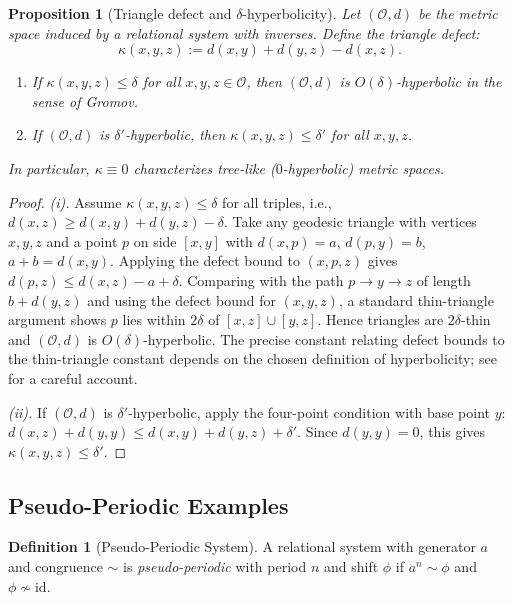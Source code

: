 \documentclass{article}
\newtheorem{proposition}[theorem]{Proposition}
\theoremstyle{definition}
\newtheorem{definition}[theorem]{Definition}
\theoremstyle{remark}
\newcommand{\id}{\mathrm{id}}
\begin{document}
\begin{proposition}[Triangle defect and $\delta$-hyperbolicity]
\label{prop:hyperbolicity}
Let $(\mathcal{O}, d)$ be the metric space induced by a relational
system with inverses. Define the \emph{triangle defect}:
\[
  \kappa(x, y, z) := d(x,y) + d(y,z) - d(x,z).
\]
\begin{enumerate}[label=(\roman*)]
  \item If $\kappa(x,y,z) \leq \delta$ for all $x,y,z \in
        \mathcal{O}$, then $(\mathcal{O}, d)$ is
        $O(\delta)$-hyperbolic in the sense of Gromov.
  \item If $(\mathcal{O}, d)$ is $\delta'$-hyperbolic, then
        $\kappa(x,y,z) \leq \delta'$ for all $x,y,z$.
\end{enumerate}
In particular, $\kappa \equiv 0$ characterizes tree-like
($0$-hyperbolic) metric spaces.
\end{proposition}

\begin{proof}
\textit{(i).} Assume $\kappa(x,y,z) \leq \delta$ for all triples,
i.e., $d(x,z) \geq d(x,y) + d(y,z) - \delta$. Take any geodesic
triangle with vertices $x,y,z$ and a point $p$ on side $[x,y]$
with $d(x,p) = a$, $d(p,y) = b$, $a + b = d(x,y)$. Applying the
defect bound to $(x,p,z)$ gives $d(p,z) \leq d(x,z) - a + \delta$.
Comparing with the path $p \to y \to z$ of length $b + d(y,z)$
and using the defect bound for $(x,y,z)$, a standard thin-triangle
argument shows $p$ lies within $2\delta$ of $[x,z] \cup [y,z]$.
Hence triangles are $2\delta$-thin and $(\mathcal{O},d)$ is
$O(\delta)$-hyperbolic. The precise constant relating defect
bounds to the thin-triangle constant depends on the chosen
definition of hyperbolicity; see~\cite{buragoetal} for a careful
account.

\textit{(ii).} If $(\mathcal{O},d)$ is $\delta'$-hyperbolic,
apply the four-point condition with base point $y$:
$d(x,z) + d(y,y) \leq d(x,y) + d(y,z) + \delta'$.
Since $d(y,y) = 0$, this gives $\kappa(x,y,z) \leq \delta'$.
\end{proof}

\subsection{Pseudo-Periodic Examples}
\label{sec:pseudoperiodic}

\begin{definition}[Pseudo-Periodic System]
\label{def:pseudoperiodic}
A relational system with generator $a$ and congruence $\sim$ is
\emph{pseudo-periodic} with period $n$ and shift $\phi$ if
$a^n \sim \phi$ and $\phi \not\sim \id$.
\end{definition}
\end{document}
